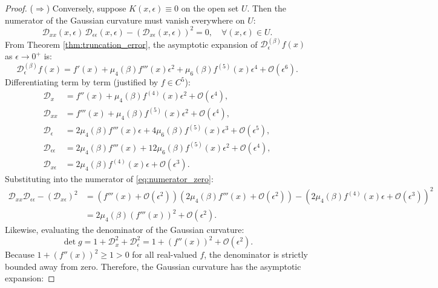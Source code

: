\documentclass[11pt,a4paper]{article}
\theoremstyle{definition}
\begin{document}
\begin{proof}
($\Rightarrow$) Conversely, suppose $K(x, \epsilon) \equiv 0$ on the open set $U$. Then the numerator of the Gaussian curvature must vanish everywhere on $U$:
\begin{equation}
\mathcal{D}_{xx}(x, \epsilon) \, \mathcal{D}_{\epsilon\epsilon}(x, \epsilon) - \left( \mathcal{D}_{x\epsilon}(x, \epsilon) \right)^2 = 0, \quad \forall (x, \epsilon) \in U.
\label{eq:numerator_zero}
\end{equation}
From Theorem \ref{thm:truncation_error}, the asymptotic expansion of $\mathcal{D}_\epsilon^{(\beta)} f(x)$ as $\epsilon \to 0^+$ is:
\begin{equation}
\mathcal{D}_\epsilon^{(\beta)} f(x) = f'(x) + \mu_4(\beta) f'''(x) \epsilon^2 + \mu_6(\beta) f^{(5)}(x) \epsilon^4 + \mathcal{O}(\epsilon^6).
\end{equation}
Differentiating term by term (justified by $f \in C^5$):
\begin{align}
\mathcal{D}_x &= f''(x) + \mu_4(\beta) f^{(4)}(x) \epsilon^2 + \mathcal{O}(\epsilon^4), \\
\mathcal{D}_{xx} &= f'''(x) + \mu_4(\beta) f^{(5)}(x) \epsilon^2 + \mathcal{O}(\epsilon^4), \\
\mathcal{D}_\epsilon &= 2 \mu_4(\beta) f'''(x) \epsilon + 4 \mu_6(\beta) f^{(5)}(x) \epsilon^3 + \mathcal{O}(\epsilon^5), \\
\mathcal{D}_{\epsilon\epsilon} &= 2 \mu_4(\beta) f'''(x) + 12 \mu_6(\beta) f^{(5)}(x) \epsilon^2 + \mathcal{O}(\epsilon^4), \\
\mathcal{D}_{x\epsilon} &= 2 \mu_4(\beta) f^{(4)}(x) \epsilon + \mathcal{O}(\epsilon^3).
\end{align}
Substituting into the numerator of \eqref{eq:numerator_zero}:
\begin{align}
\mathcal{D}_{xx}\mathcal{D}_{\epsilon\epsilon} - (\mathcal{D}_{x\epsilon})^2 &= \left( f'''(x) + \mathcal{O}(\epsilon^2) \right)\left( 2\mu_4(\beta) f'''(x) + \mathcal{O}(\epsilon^2) \right) - \left( 2\mu_4(\beta) f^{(4)}(x)\epsilon + \mathcal{O}(\epsilon^3) \right)^2 \nonumber \\
&= 2\mu_4(\beta) (f'''(x))^2 + \mathcal{O}(\epsilon^2).
\end{align}
Likewise, evaluating the denominator of the Gaussian curvature:
\begin{equation}
\det g = 1 + \mathcal{D}_x^2 + \mathcal{D}_\epsilon^2 = 1 + (f''(x))^2 + \mathcal{O}(\epsilon^2).
\end{equation}
Because $1 + (f''(x))^2 \ge 1 > 0$ for all real-valued $f$, the denominator is strictly bounded away from zero. Therefore, the Gaussian curvature has the asymptotic expansion:

\end{proof}
\end{document}

